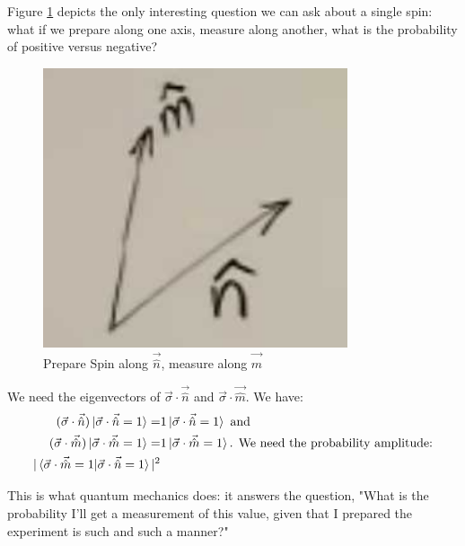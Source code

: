 \documentclass[]{article}
\begin{document}
Figure \ref{fig:et-4-1} depicts the only interesting question we can ask about a single spin: what if we prepare along one axis, measure along another, what is the probability of positive versus negative?

\begin{figure}[H]
	\caption{Prepare Spin along $\vec{\hat{n}}$, measure along $\vec{\hat{m}}$}\label{fig:et-4-1}
	\includegraphics[width=0.8\textwidth]{et-4-1}
\end{figure}

We need the eigenvectors of $\vec{\sigma} \cdot \vec{\hat{n}}$ and   $\vec{\sigma} \cdot \vec{\hat{m}}$.
We have:
\begin{align*}
	(\vec{\sigma} \cdot \vec{\hat{n}}) \ket{\vec{\sigma} \cdot \vec{\hat{n}}=1} =& 1 \ket{\vec{\sigma} \cdot \vec{\hat{n}}=1} \text{ and}\\
	(\vec{\sigma} \cdot \vec{\hat{m}}) \ket{\vec{\sigma} \cdot \vec{\hat{m}}=1} =& 1 \ket{\vec{\sigma} \cdot \vec{\hat{m}}=1} \text{. We need the probability amplitude:}\\
	\vert \braket{\vec{\sigma} \cdot \vec{\hat{m}}=1\vert\vec{\sigma} \cdot \vec{\hat{n}}=1}\vert^2
\end{align*}

This is what quantum mechanics does: it answers the question, "What is the probability I'll get a measurement of this value, given that I prepared the experiment is such and such a manner?"
\end{document}
